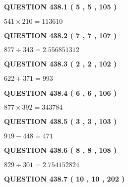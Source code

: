 \documentclass{ctexart}
\begin{document}
   
  
\vspace{0.2in}
  
{\textbf{\Large{QUESTION
438.1 
 ( 5 , 5 , 105 )
}}}
  
  
 
 

$ %
541 \times  %
210=   %
113610$
 
 
  
\vspace{0.2in}
  
{\textbf{\Large{QUESTION
438.2 
 ( 7 , 7 , 107 )
}}}
  
  
 
 

$ %
877 \div  %
343=   %
2.556851312$
 
 
  
\vspace{0.2in}
  
{\textbf{\Large{QUESTION
438.3 
 ( 2 , 2 , 102 )
}}}
  
  
 
 

$ %
622 +  %
371=   %
993$
 
 
  
\vspace{0.2in}
  
{\textbf{\Large{QUESTION
438.4 
 ( 6 , 6 , 106 )
}}}
  
  
 
 

$ %
877 \times  %
392=   %
343784$
 
 
  
\vspace{0.2in}
  
{\textbf{\Large{QUESTION
438.5 
 ( 3 , 3 , 103 )
}}}
  
  
 
 

$ %
919 -  %
448=   %
471$
 
 
  
\vspace{0.2in}
  
{\textbf{\Large{QUESTION
438.6 
 ( 8 , 8 , 108 )
}}}
  
  
 
 

$ %
829 \div  %
301=   %
2.754152824$
 
 
  
\vspace{0.2in}
  
{\textbf{\Large{QUESTION
438.7 
 ( 10 , 10 , 202 )
}}}
  
\end{document}
